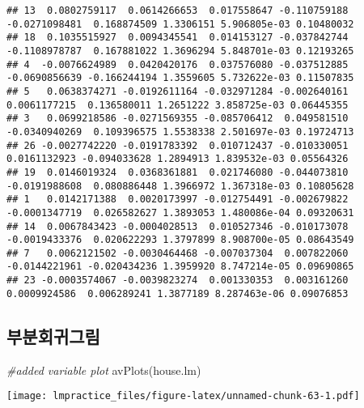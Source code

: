 \documentclass[
]{book}
\newenvironment{Shaded}{\begin{snugshade}}{\end{snugshade}}
\newcommand{\CommentTok}[1]{\textcolor[rgb]{0.56,0.35,0.01}{\textit{#1}}}
\newcommand{\FunctionTok}[1]{\textcolor[rgb]{0.00,0.00,0.00}{#1}}
\newcommand{\NormalTok}[1]{#1}
\begin{document}
\begin{verbatim}
## 13  0.0802759117  0.0614266653  0.017558647 -0.110759188 -0.0271098481  0.168874509 1.3306151 5.906805e-03 0.10480032
## 18  0.1035515927  0.0094345541  0.014153127 -0.037842744 -0.1108978787  0.167881022 1.3696294 5.848701e-03 0.12193265
## 4  -0.0076624989  0.0420420176  0.037576080 -0.037512885 -0.0690856639 -0.166244194 1.3559605 5.732622e-03 0.11507835
## 5   0.0638374271 -0.0192611164 -0.032971284 -0.002640161  0.0061177215  0.136580011 1.2651222 3.858725e-03 0.06445355
## 3   0.0699218586 -0.0271569355 -0.085706412  0.049581510 -0.0340940269  0.109396575 1.5538338 2.501697e-03 0.19724713
## 26 -0.0027742220 -0.0191783392  0.010712437 -0.010330051  0.0161132923 -0.094033628 1.2894913 1.839532e-03 0.05564326
## 19  0.0146019324  0.0368361881  0.021746080 -0.044073810 -0.0191988608  0.080886448 1.3966972 1.367318e-03 0.10805628
## 1   0.0142171388  0.0020173997 -0.012754491 -0.002679822 -0.0001347719  0.026582627 1.3893053 1.480086e-04 0.09320631
## 14  0.0067843423 -0.0004028513  0.010527346 -0.010173078 -0.0019433376  0.020622293 1.3797899 8.908700e-05 0.08643549
## 7   0.0062121502 -0.0030464468 -0.007037304  0.007822060 -0.0144221961 -0.020434236 1.3959920 8.747214e-05 0.09690865
## 23 -0.0003574067 -0.0039823274  0.001330353  0.003161260  0.0009924586  0.006289241 1.3877189 8.287463e-06 0.09076853
\end{verbatim}

\hypertarget{uxbd80uxbd84uxd68cuxadc0uxadf8uxb9bc-1}{%
\subsection{부분회귀그림}\label{uxbd80uxbd84uxd68cuxadc0uxadf8uxb9bc-1}}

\begin{Shaded}
\begin{Highlighting}[]
\CommentTok{\#added variable plot}
\FunctionTok{avPlots}\NormalTok{(house.lm)}
\end{Highlighting}
\end{Shaded}

\texttt{[image: lmpractice\_files/figure-latex/unnamed-chunk-63-1.pdf]}

  
\end{document}
